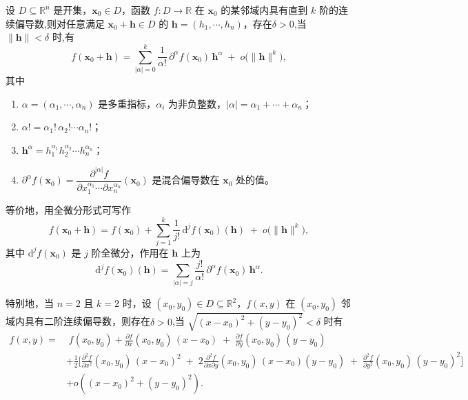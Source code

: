 \documentclass[../../main.tex]{subfiles}%
\begin{document}
\begin{theorem}[多元函数带Peano余项的Taylor公式]\label{theorem:多元函数带Peano余项的Taylor公式}
设 $D \subseteq \mathbb{R}^n$ 是开集，$\bm{x}_0 \in D$，函数 $f: D \to \mathbb{R}$ 在 $\bm{x}_0$ 的某邻域内具有直到 $k$ 阶的连续偏导数,则对任意满足 $\bm{x}_0 + \bm{h} \in D$ 的 $\bm{h} = (h_1,\cdots,h_n)$，存在$\delta>0$,当 $\|\bm{h}\| < \delta$ 时,有
\[
f(\bm{x}_0 + \bm{h}) = \sum_{|\alpha|=0}^{k} \frac{1}{\alpha!} \, \partial^\alpha f(\bm{x}_0) \, \bm{h}^\alpha \;+\; o\bigl(\|\bm{h}\|^k\bigr),
\]
其中
\begin{enumerate}[(1)]
\item $\alpha = (\alpha_1,\cdots,\alpha_n)$ 是多重指标，$\alpha_i$ 为非负整数，$|\alpha| = \alpha_1 + \cdots + \alpha_n$；
\item $\alpha! = \alpha_1! \,\alpha_2! \cdots \alpha_n!$；
\item $\bm{h}^\alpha = h_1^{\alpha_1} h_2^{\alpha_2} \cdots h_n^{\alpha_n}$；
\item $\partial^\alpha f(\bm{x}_0) = \dfrac{\partial^{|\alpha|} f}{\partial x_1^{\alpha_1} \cdots \partial x_n^{\alpha_n}}(\bm{x}_0)$ 是混合偏导数在 $\bm{x}_0$ 处的值。
\end{enumerate}
等价地，用全微分形式可写作
\[
f(\bm{x}_0 + \bm{h}) = f(\bm{x}_0) + \sum_{j=1}^{k} \frac{1}{j!}\, \mathrm{d}^j f(\bm{x}_0)(\bm{h}) \;+\; o\bigl(\|\bm{h}\|^k\bigr),
\]
其中 $\mathrm{d}^j f(\bm{x}_0)$ 是 $j$ 阶全微分，作用在 $\bm{h}$ 上为
\[
\mathrm{d}^j f(\bm{x}_0)(\bm{h}) = \sum_{|\alpha|=j} \frac{j!}{\alpha!} \, \partial^\alpha f(\bm{x}_0) \, \bm{h}^\alpha.
\]

特别地，当 $n=2$ 且 $k=2$ 时，设 $(x_0,y_0) \in D \subseteq \mathbb{R}^2$，$f(x,y)$ 在 $(x_0,y_0)$ 邻域内具有二阶连续偏导数，则存在$\delta>0$,当 $\sqrt{(x-x_0)^2+(y-y_0)^2}  < \delta$ 时有
\begin{align*}
f(x, y) = &\; f(x_0,y_0) 
+ \frac{\partial f}{\partial x}(x_0,y_0)\, (x-x_0) \;+\; \frac{\partial f}{\partial y}(x_0,y_0)\, (y-y_0) \\
&+ \frac{1}{2}\Bigg[ \frac{\partial^2 f}{\partial x^2}(x_0,y_0)\, (x-x_0)^2 \;+\; 2\frac{\partial^2 f}{\partial x \partial y}(x_0,y_0)\, (x-x_0)(y-y_0) \;+\; \frac{\partial^2 f}{\partial y^2}(x_0,y_0)\, (y-y_0)^2 \Bigg] \\
&+ o\!\left( (x-x_0)^2 + (y-y_0)^2 \right).
\end{align*}
\end{theorem}
\end{document}
